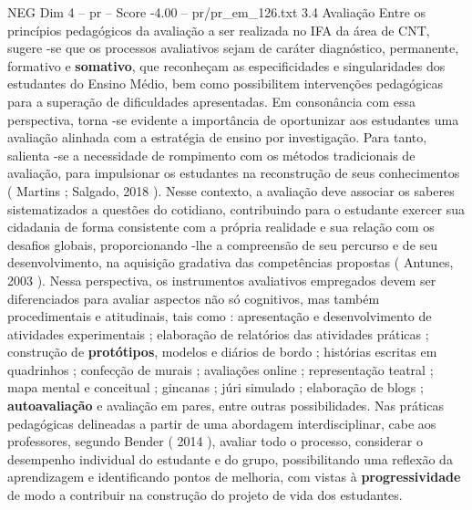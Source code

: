 \begin{textsample}{NEG Dim 4 – pr – Score -4.00 – pr/pr\_em\_126.txt}  \label{ex:f4_neg_103}
3.4 Avaliação Entre os princípios pedagógicos da avaliação a ser realizada no IFA da área de CNT, sugere -se que os processos avaliativos sejam de caráter diagnóstico, permanente, formativo e \textbf{somativo}, que reconheçam as especificidades e singularidades dos estudantes do Ensino Médio, bem como possibilitem intervenções pedagógicas para a superação de dificuldades apresentadas.
Em consonância com essa perspectiva, torna -se evidente a importância de oportunizar aos estudantes uma avaliação alinhada com a estratégia de ensino por investigação.
Para tanto, salienta -se a necessidade de rompimento com os métodos tradicionais de avaliação, para impulsionar os estudantes na reconstrução de seus conhecimentos ( Martins ; Salgado, 2018 ).
Nesse contexto, a avaliação deve associar os saberes sistematizados a questões do cotidiano, contribuindo para o estudante exercer sua cidadania de forma consistente com a própria realidade e sua relação com os desafios globais, proporcionando -lhe a compreensão de seu percurso e de seu desenvolvimento, na aquisição gradativa das competências propostas ( Antunes, 2003 ).
Nessa perspectiva, os instrumentos avaliativos empregados devem ser diferenciados para avaliar aspectos não só cognitivos, mas também procedimentais e atitudinais, tais como : apresentação e desenvolvimento de atividades experimentais ; elaboração de relatórios das atividades práticas ; construção de \textbf{protótipos}, modelos e diários de bordo ; histórias escritas em quadrinhos ; confecção de murais ; avaliações online ; representação teatral ; mapa mental e conceitual ; gincanas ; júri simulado ; elaboração de blogs ; \textbf{autoavaliação} e avaliação em pares, entre outras possibilidades.
Nas práticas pedagógicas delineadas a partir de uma abordagem interdisciplinar, cabe aos professores, segundo Bender ( 2014 ), avaliar todo o processo, considerar o desempenho individual do estudante e do grupo, possibilitando uma reflexão da aprendizagem e identificando pontos de melhoria, com vistas à \textbf{progressividade} de modo a contribuir na construção do projeto de vida dos estudantes.

\end{textsample}
